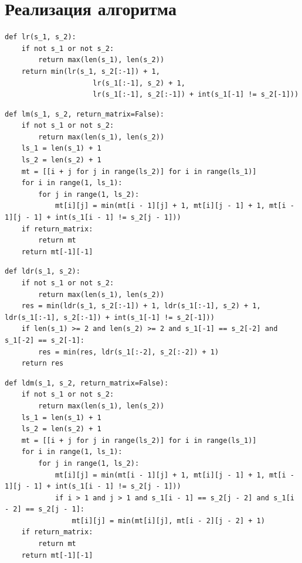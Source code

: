 \documentclass[12pt, a4paper]{report}
\begin{document}
\section{Реализация алгоритма}

\begin{lstlisting}[label=some-code,caption=Функция нахождения расстояния Левенштейна рекурсивно]
def lr(s_1, s_2):
	if not s_1 or not s_2:
		return max(len(s_1), len(s_2))
	return min(lr(s_1, s_2[:-1]) + 1, 
					 lr(s_1[:-1], s_2) + 1, 
					 lr(s_1[:-1], s_2[:-1]) + int(s_1[-1] != s_2[-1]))
\end{lstlisting}

\begin{lstlisting}[label=some-code,caption=Функция нахождения расстояния Левенштейна матрично]
def lm(s_1, s_2, return_matrix=False):
	if not s_1 or not s_2:
		return max(len(s_1), len(s_2))
	ls_1 = len(s_1) + 1
	ls_2 = len(s_2) + 1
	mt = [[i + j for j in range(ls_2)] for i in range(ls_1)]
	for i in range(1, ls_1):
		for j in range(1, ls_2):
			mt[i][j] = min(mt[i - 1][j] + 1, mt[i][j - 1] + 1, mt[i - 1][j - 1] + int(s_1[i - 1] != s_2[j - 1]))
	if return_matrix:
		return mt
	return mt[-1][-1]
\end{lstlisting}


\begin{lstlisting}[label=some-code,caption=Функция нахождения расстояния Дамерау-Левенштейна рекурсивно]
def ldr(s_1, s_2):
	if not s_1 or not s_2:
		return max(len(s_1), len(s_2))
	res = min(ldr(s_1, s_2[:-1]) + 1, ldr(s_1[:-1], s_2) + 1, ldr(s_1[:-1], s_2[:-1]) + int(s_1[-1] != s_2[-1]))
	if len(s_1) >= 2 and len(s_2) >= 2 and s_1[-1] == s_2[-2] and s_1[-2] == s_2[-1]:
		res = min(res, ldr(s_1[:-2], s_2[:-2]) + 1)
	return res
\end{lstlisting}

\begin{lstlisting}[label=some-code,caption=Функция нахождения расстояния Дамерау-Левенштейна матрично]
def ldm(s_1, s_2, return_matrix=False):
	if not s_1 or not s_2:
		return max(len(s_1), len(s_2))
	ls_1 = len(s_1) + 1
	ls_2 = len(s_2) + 1
	mt = [[i + j for j in range(ls_2)] for i in range(ls_1)]
	for i in range(1, ls_1):
		for j in range(1, ls_2):
			mt[i][j] = min(mt[i - 1][j] + 1, mt[i][j - 1] + 1, mt[i - 1][j - 1] + int(s_1[i - 1] != s_2[j - 1]))
			if i > 1 and j > 1 and s_1[i - 1] == s_2[j - 2] and s_1[i - 2] == s_2[j - 1]:
				mt[i][j] = min(mt[i][j], mt[i - 2][j - 2] + 1)
	if return_matrix:
		return mt
	return mt[-1][-1]
\end{lstlisting}
\end{document}
